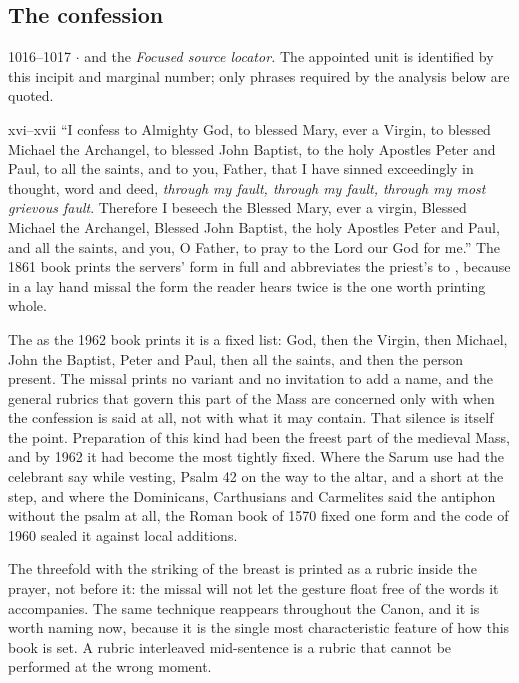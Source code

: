\subsection*{The confession}

\begin{appointed}{1016--1017 $\cdot$  and the }
\textit{Focused source locator.} The appointed unit is identified by this incipit and marginal number; only phrases required by the analysis below are quoted.
\end{appointed}

\begin{englishwitness}{xvi--xvii}
``I confess to Almighty God, to blessed Mary, ever a Virgin, to blessed Michael
the Archangel, to blessed John Baptist, to the holy Apostles Peter and Paul, to
all the saints, and to you, Father, that I have sinned exceedingly in thought,
word and deed, \emph{through my fault, through my fault, through my most
grievous fault}. Therefore I beseech the Blessed Mary, ever a virgin, Blessed
Michael the Archangel, Blessed John Baptist, the holy Apostles Peter and Paul,
and all the saints, and you, O Father, to pray to the Lord our God for me.''
The 1861 book prints the servers' form in full and abbreviates the priest's to
, because in a lay hand missal the
form the reader hears twice is the one worth printing whole.
\end{englishwitness}

The  as the 1962 book prints it is a fixed list: God, then the
Virgin, then Michael, John the Baptist, Peter and Paul, then all the saints,
and then the person present. The missal prints no variant and no invitation to
add a name, and the general rubrics that govern this part of the Mass are
concerned only with when the confession is said at all, not with what it may
contain. That silence is itself the point. Preparation of this kind had been
the freest part of the medieval Mass, and by 1962 it had become the most
tightly fixed. Where
the Sarum use had the celebrant say  while vesting,
Psalm 42 on the way to the altar, and a short  at the step,
and where the Dominicans, Carthusians and Carmelites said the antiphon without
the psalm at all, the Roman book of 1570 fixed one form and the code of 1960
sealed it against local additions.

The threefold  with the striking of the breast is printed
as a rubric inside the prayer, not before it: the missal will not let the
gesture float free of the words it accompanies. The same technique reappears
throughout the Canon, and it is worth naming now, because it is the single
most characteristic feature of how this book is set. A rubric interleaved
mid-sentence is a rubric that cannot be performed at the wrong moment.

